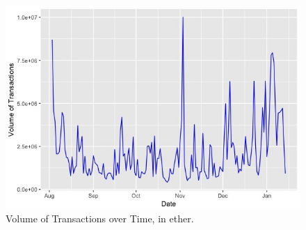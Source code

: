 \begin{figure}[ht]
  \centering
  \includegraphics[width=\linewidth]{figures/volume_over_time.jpeg}
  \caption{Volume of Transactions over Time, in ether.}
  \label{fig:volume_over_time}
\end{figure}

